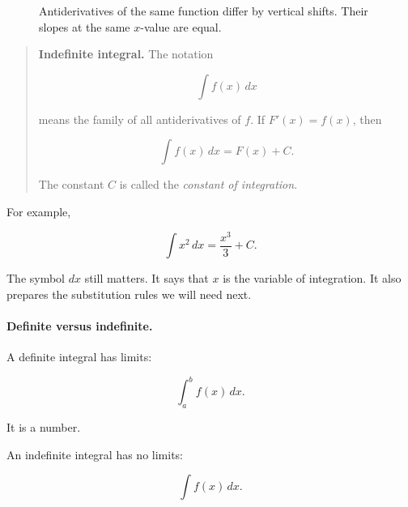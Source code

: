 \begin{figure}[h]
\centering
{}
\caption{Antiderivatives of the same function differ by vertical shifts.  Their slopes at the same \(x\)-value are equal.}
\label{fig:antiderivative-family-shifts}
\end{figure}

\begin{quote}
\textbf{Indefinite integral.}
The notation

\[
\boxed{
\int f(x)\,dx
}
\]

means the family of all antiderivatives of \(f\).  If \(F'(x)=f(x)\), then

\[
\boxed{
\int f(x)\,dx=F(x)+C.
}
\]

The constant \(C\) is called the \emph{constant of integration}.
\end{quote}

For example,

\[
\boxed{
\int x^2\,dx=\frac{x^3}{3}+C.
}
\]

The symbol \(dx\) still matters.  It says that \(x\) is the variable of integration.  It also
prepares the substitution rules we will need next.

\paragraph{Definite versus indefinite.}
A definite integral has limits:

\[
\int_a^b f(x)\,dx.
\]

It is a number.

An indefinite integral has no limits:

\[
\int f(x)\,dx.
\]

